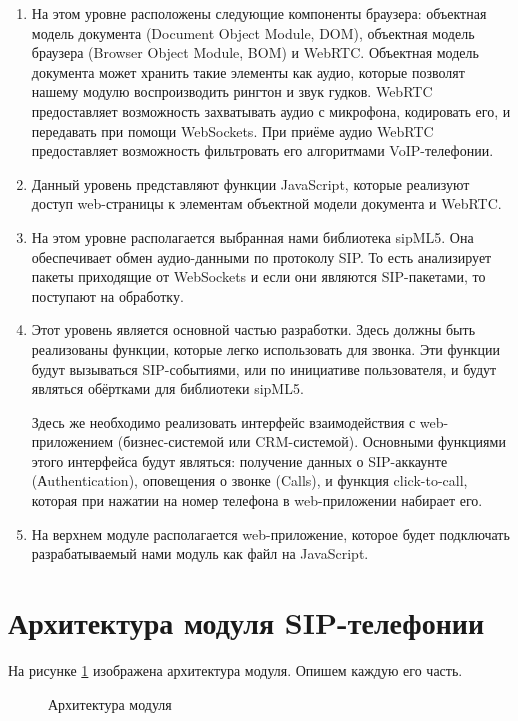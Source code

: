 \begin{enumerate}
\item На этом уровне расположены следующие компоненты браузера: объектная модель документа (Document Object Module, DOM), объектная модель браузера (Browser Object Module, BOM) и WebRTC. Объектная модель документа может хранить такие элементы как аудио, которые позволят нашему модулю воспроизводить рингтон и звук гудков. WebRTC предоставляет возможность захватывать аудио с микрофона, кодировать его, и передавать при помощи WebSockets. При приёме аудио WebRTC предоставляет возможность фильтровать его алгоритмами VoIP-телефонии.

\item Данный уровень представляют функции JavaScript, которые реализуют доступ web-страницы к элементам объектной модели документа и WebRTC.

\item На этом уровне располагается выбранная нами библиотека sipML5. Она обеспечивает обмен аудио-данными по протоколу SIP. То есть анализирует пакеты приходящие от WebSockets и если они являются SIP-пакетами, то поступают на обработку.

\item Этот уровень является основной частью разработки. Здесь должны быть реализованы функции, которые легко использовать для звонка. Эти функции будут вызываться SIP-событиями, или по инициативе пользователя, и будут являться обёртками для библиотеки sipML5.

Здесь же необходимо реализовать интерфейс взаимодействия с web-приложением (бизнес-системой или CRM-системой). Основными функциями этого интерфейса будут являться: получение данных о SIP-аккаунте (Аuthentication), оповещения о звонке (Calls), и функция click-to-call, которая при нажатии на номер телефона в web-приложении набирает его.

\item На верхнем модуле располагается web-приложение, которое будет подключать разрабатываемый нами модуль как файл на JavaScript.
\end{enumerate}

\section{Архитектура модуля SIP-телефонии}

На рисунке \ref{image:architecture} изображена архитектура модуля. Опишем каждую его часть.

\begin{figure}[h!]
\caption{Архитектура модуля}
\label{image:architecture}
\end{figure}

